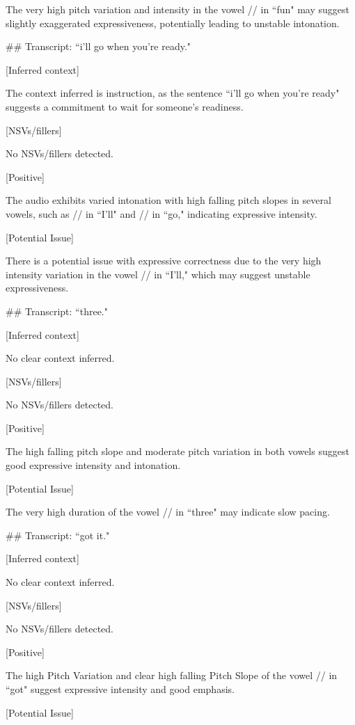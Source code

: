 \begin{tcolorbox}  

The very high pitch variation and intensity in the vowel // in ``fun" may suggest slightly exaggerated expressiveness, potentially leading to unstable intonation.


\#\# Transcript: ``i'll go when you're ready."

[Inferred context]  

The context inferred is instruction, as the sentence ``i'll go when you're ready" suggests a commitment to wait for someone's readiness.


[NSVs/fillers]  

No NSVs/fillers detected.


[Positive]  

The audio exhibits varied intonation with high falling pitch slopes in several vowels, such as // in ``I'll" and // in ``go," indicating expressive intensity.


[Potential Issue]  

There is a potential issue with expressive correctness due to the very high intensity variation in the vowel // in ``I'll," which may suggest unstable expressiveness.


\#\# Transcript: ``three."

[Inferred context]  

No clear context inferred.


[NSVs/fillers]  

No NSVs/fillers detected.


[Positive]  

The high falling pitch slope and moderate pitch variation in both vowels suggest good expressive intensity and intonation.


[Potential Issue]  

The very high duration of the vowel // in ``three" may indicate slow pacing.


\#\# Transcript: ``got it."

[Inferred context]  

No clear context inferred.


[NSVs/fillers]  

No NSVs/fillers detected.


[Positive]  

The high Pitch Variation and clear high falling Pitch Slope of the vowel // in ``got" suggest expressive intensity and good emphasis.


[Potential Issue]  


\end{tcolorbox}
